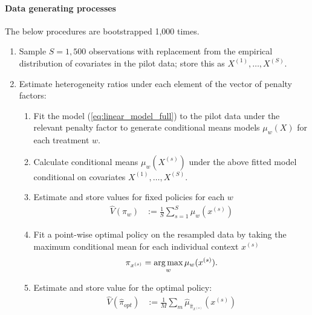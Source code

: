 \documentclass[letterpaper, 12pt, parskip=full,DIV=10]{scrartcl}
\begin{document}
\paragraph{Data generating processes} 
The below procedures are bootstrapped 1,000 times. 
\begin{enumerate}
\item  Sample $S=1,500$ observations with replacement from the empirical distribution of covariates in the pilot data; store this as $X^{(1)}, \dots,X^{(S)}$. 
\item Estimate heterogeneity ratios under each element of the vector of penalty factors:
\begin{enumerate}
\item Fit the model (\ref{eq:linear_model_full}) to the pilot data under the relevant penalty factor to generate conditional means models $\mu_{w}(X)$ for each treatment $w$.
  \item Calculate conditional means $\mu_{w}(X^{(s)})$ under the above fitted model conditional on covariates $X^{(1)}, \dots,X^{(S)}$. 
  \item Estimate and store values for fixed policies for each $w$
      \begin{align}
          \hat{V}({\pi}_{w})  &:= \frac{1}{S} \sum_{s = 1}^S \mu_{w}(x^{(s)}) 
          \end{align}
  \item Fit a point-wise optimal policy on the resampled data by taking the maximum conditional mean for each individual context $x^{(s)}$ 
    \begin{equation}
     \pi_{x^{(s)}} = \operatorname*{arg\,max}_{ w } \mu_{w}(x^{(s)}) . 
    \end{equation} 
    \item Estimate and store value for the optimal policy:
    \begin{align}
      \hat{V}(\hat{\pi}_{opt})  &:= \frac{1}{M} \sum_m \hat{\mu}_{\hat{\pi}_{x^{(s)}}}(x^{(s)}) 

\end{align}
\end{enumerate}
\end{enumerate}
\end{document}
